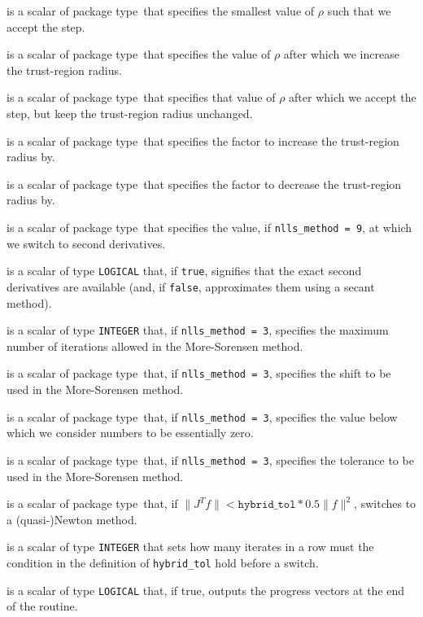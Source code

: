 \documentclass{spec}
\newcommand{\scalarinteger}{is a scalar of type {\tt INTEGER} }
\newcommand{\scalarlogical}{is a scalar of type {\tt LOGICAL} }
\newcommand{\scalarreal}{is a scalar of package type\ }
\begin{document}
\begin{description}
 \scalarreal that specifies the smallest value of $\rho$ such that we accept the step.  

 \scalarreal that specifies the value of $\rho$ after which we increase the trust-region radius.

 \scalarreal that specifies that value of $\rho$ after which we accept the step, 
but keep the trust-region radius unchanged.

 \scalarreal that specifies the factor to increase the trust-region radius by.

 \scalarreal that specifies the factor to decrease the trust-region radius by.

 \scalarreal that specifies the value, if {\tt nlls\_method = 9}, 
at which we switch to second derivatives.

 \scalarlogical that, if {\tt true}, signifies that the
exact second derivatives are available (and, if {\tt false}, approximates them using a secant method).

 \scalarinteger that, if {\tt nlls\_method = 3}, specifies the maximum number of iterations allowed in the More-Sorensen method.

 \scalarreal that, if {\tt nlls\_method = 3}, specifies the shift to be used in the More-Sorensen method.

 \scalarreal that, if {\tt nlls\_method = 3}, specifies the value 
below which we consider numbers to be essentially zero.

 \scalarreal that, if {\tt nlls\_method = 3}, specifies the tolerance
to be used in the More-Sorensen method.

 \scalarreal that, if \(\|J^T f \| < \mathtt{hybrid\_tol} * 0.5 \|f\|^2\), switches to a (quasi-)Newton method.

 \scalarinteger that sets how many iterates in a row must 
the condition in the definition of {\tt hybrid\_tol} hold before a switch.

 \scalarlogical that, if true, outputs the progress vectors at the end of the routine.

\end{description}
\end{document}
